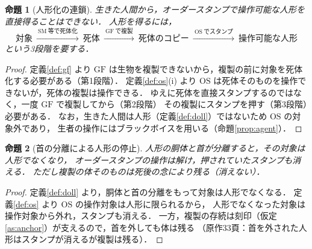 \documentclass[a4paper,12pt]{jarticle}
\theoremstyle{definition}
\theoremstyle{plain}
\newtheorem{prop}{命題}
\theoremstyle{definition}
\theoremstyle{remark}
\newtheorem*{remark}{注意}
\newcommand{\GF}{\mathrm{GF}}    %
\newcommand{\OS}{\mathrm{OS}}    %
\newcommand{\SM}{\mathrm{SM}}    %
\begin{document}

\begin{prop}[人形化の連鎖]\label{prop:chain}
生きた人間から，オーダースタンプで操作可能な人形を直接得ることはできない．
人形を得るには，
\[
\text{対象}\ \xrightarrow{\ \SM\ \text{等で死体化}\ }\ \text{死体}
\ \xrightarrow{\ \GF\ \text{で複製}\ }\ \text{死体のコピー}
\ \xrightarrow{\ \OS\ \text{でスタンプ}\ }\ \text{操作可能な人形}
\]
という3段階を要する．
\end{prop}

\begin{proof}
定義\ref{def:gf} より $\GF$ は生物を複製できないから，複製の前に対象を死体化する必要がある（第1段階）．
定義\ref{def:os}(i) より $\OS$ は死体そのものを操作できないが，死体の複製は操作できる．
ゆえに死体を直接スタンプするのではなく，一度 $\GF$ で複製してから（第2段階）
その複製にスタンプを押す（第3段階）必要がある．
なお，生きた人間は人形（定義\ref{def:doll}）ではないため $\OS$ の対象外であり，
生者の操作にはブラックボイスを用いる（命題\ref{prop:agent}）．
\end{proof}

\begin{prop}[首の分離による人形の停止]\label{prop:decap}
人形の胴体と首が分離すると，その対象は人形でなくなり，
オーダースタンプの操作は解け，押されていたスタンプも消える．
ただし{複製の体そのものは死後の念により残る}（消えない）．
\end{prop}

\begin{proof}
定義\ref{def:doll} より，胴体と首の分離をもって対象は人形でなくなる．
定義\ref{def:os} より $\OS$ の操作対象は人形に限られるから，
人形でなくなった対象は操作対象から外れ，スタンプも消える．
一方，複製の存続は刻印（仮定\ref{as:anchor}）が支えるので，首を外しても体は残る
（{原作33頁}：首を外された人形はスタンプが消えるが複製は残る）．
\end{proof}
\end{document}

